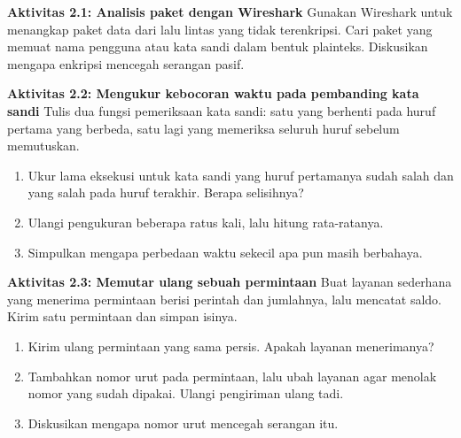 \begin{obeactivity}
\textbf{Aktivitas 2.1: Analisis paket dengan Wireshark}
Gunakan Wireshark untuk menangkap paket data dari lalu lintas yang tidak
terenkripsi. Cari paket yang memuat nama pengguna atau kata sandi dalam bentuk
plainteks. Diskusikan mengapa enkripsi mencegah serangan pasif.
\end{obeactivity}

\begin{obeactivity}
\textbf{Aktivitas 2.2: Mengukur kebocoran waktu pada pembanding kata sandi}
Tulis dua fungsi pemeriksaan kata sandi: satu yang berhenti pada huruf pertama
yang berbeda, satu lagi yang memeriksa seluruh huruf sebelum memutuskan.
\begin{enumerate}
    \item Ukur lama eksekusi untuk kata sandi yang huruf pertamanya sudah salah
          dan yang salah pada huruf terakhir. Berapa selisihnya?
    \item Ulangi pengukuran beberapa ratus kali, lalu hitung rata-ratanya.
    \item Simpulkan mengapa perbedaan waktu sekecil apa pun masih berbahaya.
\end{enumerate}
\end{obeactivity}

\begin{obeactivity}
\textbf{Aktivitas 2.3: Memutar ulang sebuah permintaan}
Buat layanan sederhana yang menerima permintaan berisi perintah dan jumlahnya,
lalu mencatat saldo. Kirim satu permintaan dan simpan isinya.
\begin{enumerate}
    \item Kirim ulang permintaan yang sama persis. Apakah layanan menerimanya?
    \item Tambahkan nomor urut pada permintaan, lalu ubah layanan agar menolak
          nomor yang sudah dipakai. Ulangi pengiriman ulang tadi.
    \item Diskusikan mengapa nomor urut mencegah serangan itu.
\end{enumerate}
\end{obeactivity}

